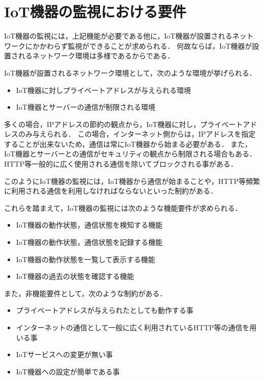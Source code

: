 \section{IoT機器の監視における要件}%
IoT機器の監視には，上記機能が必要である他に，IoT機器が設置されるネットワークにかかわらず監視ができることが求められる．
何故ならば，IoT機器が設置されるネットワーク環境は多様であるからである．
\medskip

IoT機器が設置されるネットワーク環境として，次のような環境が挙げられる．
\begin{itemize}
	\item IoT機器に対しプライベートアドレスが与えられる環境
	\item IoT機器とサーバーの通信が制限される環境
\end{itemize}

多くの場合，IPアドレスの節約の観点から，IoT機器に対し，プライベートアドレスのみ与えられる．
この場合，インターネット側からは，IPアドレスを指定することが出来ないため，通信は常にIoT機器から始まる必要がある．
また，IoT機器とサーバーとの通信がセキュリティの観点から制限される場合もある．
HTTP等一般的に広く使用される通信を除いてブロックされる事がある．
\medskip

このようにIoT機器の監視には，IoT機器から通信が始まることや，HTTP等頻繁に利用される通信を利用しなければならないといった制約がある．




これらを踏まえて，IoT機器の監視には次のような機能要件が求められる．
\begin{itemize}
	\item IoT機器の動作状態，通信状態を検知する機能
	\item IoT機器の動作状態，通信状態を記録する機能
	\item IoT機器の動作状態を一覧して表示する機能
	\item IoT機器の過去の状態を確認する機能
\end{itemize}
また，非機能要件として，次のような制約がある．
\begin{itemize}
	\item プライベートアドレスが与えられたとしても動作する事
	\item インターネットの通信として一般に広く利用されているHTTP等の通信を用いる事
	\item IoTサービスへの変更が無い事
	\item IoT機器への設定が簡単である事
\end{itemize}


